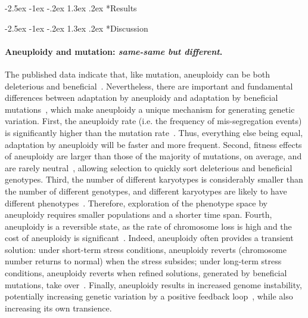 \documentclass[12pt]{extarticle}
\makeatletter
\renewcommand\section{\@startsection {section}{1}{\z@}%
     {-2.5ex \@plus -1ex \@minus -.2ex}%
     {1.3ex \@plus.2ex}%
    {\Large\bfseries}}
\makeatother
\begin{document}
 
\pagebreak
\section*{Results}

\pagebreak
\section*{Discussion}

\paragraph*{Aneuploidy and mutation: \textit{same-same but different}.}
The published data indicate that, like mutation, aneuploidy can be both deleterious and beneficial~\citep{Pavelka2010, Sheltzer2011}.
Nevertheless, there are important and fundamental differences between adaptation by aneuploidy
and adaptation by beneficial mutations~\citep{Yona2015}, which make aneuploidy a unique mechanism for generating genetic
variation.
First, the aneuploidy rate (i.e. the frequency of mis-segregation events) is significantly higher than the
mutation rate~\citep{Santaguida2015review}.
Thus, everything else being equal, adaptation by aneuploidy will be faster and more frequent.
Second, fitness effects of aneuploidy are larger than those of the majority of mutations, on average, and are rarely
neutral~\citep{Pavelka2010, Yona2012, Sunshine2015}, allowing selection to quickly sort deleterious and beneficial genotypes.
Third, the number of different karyotypes is considerably smaller than the number of different genotypes, and different karyotypes are likely to have different phenotypes~\citep{Pavelka2010}.
Therefore, exploration of the phenotype space by aneuploidy requires smaller populations and a shorter time span.
Fourth, aneuploidy is a reversible state, as the rate of chromosome loss is high and the cost of aneuploidy is significant~\citep{Niwa2006}.
Indeed, aneuploidy often provides a transient solution: under short-term stress conditions, aneuploidy reverts (chromosome number returns to normal) when the stress subsides; under long-term stress conditions, aneuploidy reverts when refined solutions, generated by beneficial mutations, take over~\citep{Yona2012}.
Finally, aneuploidy results in increased genome instability, potentially increasing genetic variation by a positive feedback loop~\citep{Rancati2013, Bouchonville2009, Zhu2012}, while also increasing its own transience.
\end{document}
